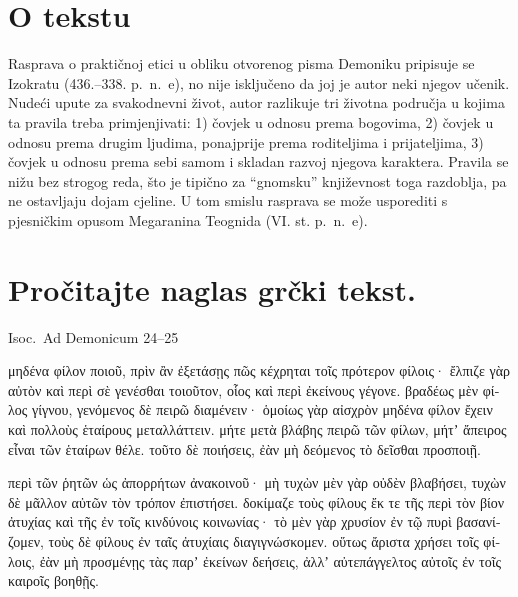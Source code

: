 


\section*{O tekstu}

Rasprava o praktičnoj etici u obliku otvorenog pisma Demoniku pripisuje se Izokratu (436.–338. p.~n.~e), no nije isključeno da joj je autor neki njegov učenik. Nudeći upute za svakodnevni život, autor razlikuje tri životna područja u kojima ta pravila treba primjenjivati: 1) čovjek u odnosu prema bogovima, 2) čovjek u odnosu prema drugim ljudima, ponajprije prema roditeljima i prijateljima, 3) čovjek u odnosu prema sebi samom i skladan razvoj njegova karaktera. Pravila se nižu bez strogog reda, što je tipično za ``gnomsku'' književnost toga razdoblja, pa ne ostavljaju dojam cjeline. U tom smislu rasprava se može usporediti s pjesničkim opusom Megaranina Teognida (VI. st. p.~n.~e).


\section*{Pročitajte naglas grčki tekst.}

Isoc.\ Ad Demonicum 24–25


\medskip


{\large

\begin{greek}

\noindent μηδένα φίλον ποιοῦ, πρὶν ἂν ἐξετάσῃς πῶς κέχρηται τοῖς πρότερον φίλοις· ἔλπιζε γὰρ αὐτὸν καὶ περὶ σὲ γενέσθαι τοιοῦτον, οἷος καὶ περὶ ἐκείνους γέγονε. βραδέως μὲν φίλος γίγνου, γενόμενος δὲ πειρῶ διαμένειν· ὁμοίως γὰρ αἰσχρὸν μηδένα φίλον ἔχειν καὶ πολλοὺς ἑταίρους μεταλλάττειν. μήτε μετὰ βλάβης πειρῶ τῶν φίλων, μήτʼ ἄπειρος εἶναι τῶν ἑταίρων θέλε. τοῦτο δὲ ποιήσεις, ἐὰν μὴ δεόμενος τὸ δεῖσθαι προσποιῇ.

\noindent περὶ τῶν ῥητῶν ὡς ἀπορρήτων ἀνακοινοῦ· μὴ τυχὼν μὲν γὰρ οὐδὲν βλαβήσει, τυχὼν δὲ μᾶλλον αὐτῶν τὸν τρόπον ἐπιστήσει. δοκίμαζε τοὺς φίλους ἔκ τε τῆς περὶ τὸν βίον ἀτυχίας καὶ τῆς ἐν τοῖς κινδύνοις κοινωνίας· τὸ μὲν γὰρ χρυσίον ἐν τῷ πυρὶ βασανίζομεν, τοὺς δὲ φίλους ἐν ταῖς ἀτυχίαις διαγιγνώσκομεν. οὕτως ἄριστα χρήσει τοῖς φίλοις, ἐὰν μὴ προσμένῃς τὰς παρʼ ἐκείνων δεήσεις, ἀλλʼ αὐτεπάγγελτος αὐτοῖς ἐν τοῖς καιροῖς βοηθῇς.

\end{greek}

}


